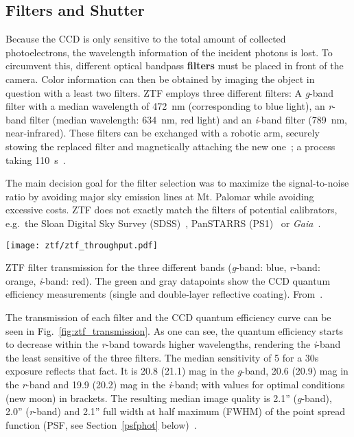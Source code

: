 \subsection{Filters and Shutter}\label{ztf_filters}
Because the CCD is only sensitive to the total amount of collected photoelectrons, the wavelength information of the incident photons is lost. To circumvent this, different optical bandpass \textbf{filters} must be placed in front of the camera. Color information can then be obtained by imaging the object in question with a least two filters. ZTF employs three different filters: A \textit{g}-band filter with a median wavelength of \SI{472}{\nano\meter} (corresponding to blue light), an \textit{r}-band filter (median wavelength: \SI{634}{\nano\meter}, red light) and an \textit{i}-band filter (\SI{789}{\nano\meter}, near-infrared). These filters can be exchanged with a robotic arm, securely stowing the replaced filter and magnetically attaching the new one~\cite{Dekany2020}; a process taking \SI{110}{\second}~\cite{Bellm2019}. 

The main decision goal for the filter selection was to maximize the signal-to-noise ratio by avoiding major sky emission lines at Mt. Palomar while avoiding excessive costs. ZTF does not exactly match the filters of potential calibrators, e.g.\ the Sloan Digital Sky Survey (SDSS)~, PanSTARRS (PS1)~ or \textit{Gaia}~.

\begin{marginfigure}
    \texttt{[image: ztf/ztf\_throughput.pdf]}
    \caption[ZTF filter transmission]{ZTF filter transmission for the three different bands (\textit{g}-band: blue, \textit{r}-band: orange, \textit{i}-band: red). The green and gray datapoints show the CCD quantum efficiency measurements (single and double-layer reflective coating). From~\cite{Bellm2019}.}
\end{marginfigure}

The transmission of each filter and the CCD quantum efficiency curve can be seen in Fig.~\ref{fig:ztf_transmission}. As one can see, the quantum efficiency starts to decrease within the \textit{r}-band towards higher wavelengths, rendering the \textit{i}-band the least sensitive of the three filters. The median sensitivity of \SI{5}{\sigma} for a 30s exposure reflects that fact. It is 20.8 (21.1) mag in the \textit{g}-band, 20.6 (20.9) mag in the \textit{r}-band and 19.9 (20.2) mag in the \textit{i}-band; with values for optimal conditions (new moon) in brackets. The resulting median image quality is 2.1'' (\textit{g}-band), 2.0'' (\textit{r}-band) and 2.1'' full width at half maximum (FWHM) of the point spread function (PSF, see Section~\ref{psfphot} below)~\cite{Bellm2019}.

